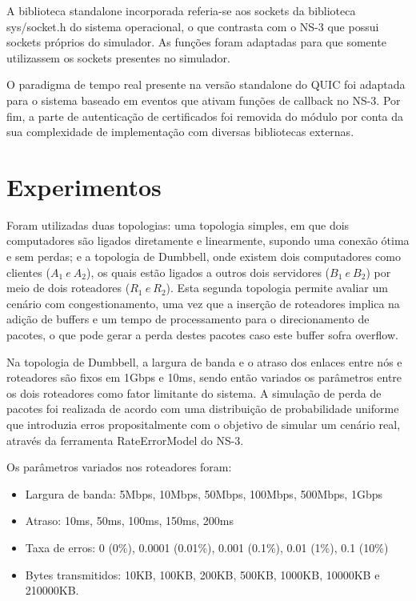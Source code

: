 \documentclass{article}
\begin{document}
A biblioteca standalone incorporada referia-se aos sockets da biblioteca sys/socket.h do sistema operacional, o que
contrasta com o NS-3 que possui sockets próprios do simulador. As funções foram adaptadas para que somente utilizassem
os sockets presentes no simulador.

O paradigma de tempo real presente na versão standalone do QUIC foi adaptada para o sistema baseado em eventos que
ativam funções de callback no NS-3. Por fim, a parte de autenticação de certificados foi removida do módulo por conta da
sua complexidade de implementação com diversas bibliotecas externas.

\section{Experimentos}
Foram utilizadas duas topologias: uma topologia simples, em que dois computadores são ligados diretamente e linearmente,
supondo uma conexão ótima e sem perdas; e a topologia de Dumbbell, onde existem dois computadores como clientes ($A_{1}\
e\ A_{2}$), os quais estão ligados a outros dois servidores ($B_{1}\ e\ B_{2}$) por meio de dois roteadores ($R_{1}\ e\
R_{2}$). Esta segunda topologia permite avaliar um cenário com congestionamento, uma vez que a inserção de roteadores
implica na adição de buffers e um tempo de processamento para o direcionamento de pacotes, o que pode gerar a perda
destes pacotes caso este buffer sofra overflow.

Na topologia de Dumbbell, a largura de banda e o atraso dos enlaces entre nós e roteadores são fixos em 1Gbps e 10ms,
sendo então variados os parâmetros entre os dois roteadores como fator limitante do sistema. A simulação de perda de
pacotes foi realizada de acordo com uma distribuição de probabilidade uniforme que introduzia erros propositalmente com
o objetivo de simular um cenário real, através da ferramenta RateErrorModel do NS-3.

Os parâmetros variados nos roteadores foram:
\begin{itemize}
\item Largura de banda: 5Mbps, 10Mbps, 50Mbps, 100Mbps, 500Mbps, 1Gbps
\item Atraso: 10ms, 50ms, 100ms, 150ms, 200ms
\item Taxa de erros: 0 (0\%), 0.0001 (0.01\%), 0.001 (0.1\%), 0.01 (1\%), 0.1 (10\%)
\item Bytes transmitidos: 10KB, 100KB, 200KB, 500KB, 1000KB, 10000KB e 210000KB.
\end{itemize}
\end{document}
